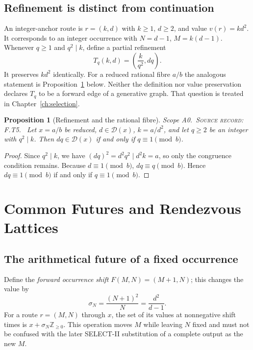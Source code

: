 \documentclass[11pt,oneside,openany]{book}
\newtheorem{proposition}[theorem]{Proposition}
\theoremstyle{definition}
\theoremstyle{remark}
\newcommand{\Z}{\mathbb{Z}}
\newcommand{\Dx}{\mathcal{D}}
\newcommand{\scope}[1]{\textsf{\small Scope #1.}\ }
\newcommand{\record}[1]{\textup{\textsc{Source record: #1.}}\ }
\begin{document}
\section{Refinement is distinct from continuation}
An integer-anchor route is \(r=(k,d)\) with \(k\ge1\), \(d\ge2\), and value \(v(r)=kd^2\). It corresponds to an integer occurrence with \(N=d-1\), \(M=k(d-1)\). Whenever \(q\ge1\) and \(q^2\mid k\), define a partial refinement
\[
 T_q(k,d)=\left(\frac{k}{q^2},dq\right).
\]
It preserves \(kd^2\) identically. For a reduced rational fibre \(a/b\) the analogous statement is Proposition~\ref{prop:refine} below. Neither the definition nor value preservation declares \(T_q\) to be a forward edge of a generative graph. That question is treated in Chapter~\ref{ch:selection}.

\begin{proposition}[Refinement and the rational fibre]\label{prop:refine}
\scope{A0}\record{F.T5} Let \(x=a/b\) be reduced, \(d\in\Dx(x)\), \(k=a/d^2\), and let \(q\ge2\) be an integer with \(q^2\mid k\). Then \(dq\in\Dx(x)\) if and only if \(q\equiv1\pmod b\).
\end{proposition}
\begin{proof}
Since \(q^2\mid k\), we have \((dq)^2=d^2q^2\mid d^2k=a\), so only the congruence condition remains. Because \(d\equiv1\pmod b\), \(dq\equiv q\pmod b\). Hence \(dq\equiv1\pmod b\) if and only if \(q\equiv1\pmod b\).
\end{proof}

\chapter{Common Futures and Rendezvous Lattices}\label{ch:rendezvous}
\section{The arithmetical future of a fixed occurrence}
Define the \emph{forward occurrence shift} \(F(M,N)=(M+1,N)\); this changes the value by
\[
 \sigma_N=\frac{(N+1)^2}{N}=\frac{d^2}{d-1}.
\]
For a route \(r=(M,N)\) through \(x\), the set of its values at nonnegative shift times is \(x+\sigma_N\Z_{\ge0}\). This operation moves \(M\) while leaving \(N\) fixed and must not be confused with the later SELECT-II substitution of a complete output as the new \(M\).
\end{document}
